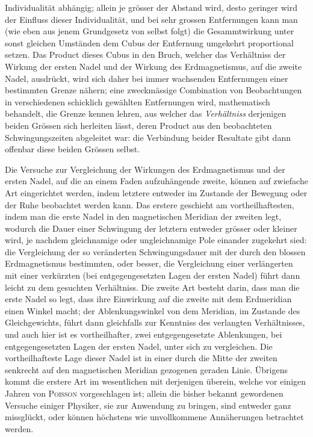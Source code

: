 Individualität abhängig; allein je grösser der Abstand wird, desto
geringer wird der Einfluss dieser Individualität, und bei sehr grossen
Entfernungen kann man (wie eben aus jenem Grundgesetz von selbst folgt)
die Gesammtwirkung unter sonst gleichen Umständen dem Cubus der Entfernung
umgekehrt proportional setzen. Das Product dieses Cubus in den Bruch,
welcher das Verhältniss der Wirkung der ersten Nadel und der Wirkung des
Erdmagnetismus, auf die zweite Nadel, ausdrückt, wird sich daher bei immer
wachsenden Entfernungen einer bestimmten Grenze nähern; eine zweckmässige
Combination von Beobachtungen in verschiedenen schicklich gewählten
Entfernungen wird, mathematisch behandelt, die Grenze kennen lehren,
aus welcher das \textit{Verhältniss} derjenigen beiden Grössen sich
herleiten lässt, deren Product aus den beobachteten Schwingungszeiten
abgeleitet war: die Verbindung beider Resultate gibt dann offenbar
diese beiden Grössen selbst.

Die Versuche zur Vergleichung der Wirkungen des Erdmagnetismus und der
ersten Nadel, auf die an einem Faden aufzuhängende zweite, können auf
\clearpage
{}
\noindent
zwiefache Art eingerichtet werden, indem letztere entweder im Zustande der
Bewegung oder der Ruhe beobachtet werden kann. Das erstere geschieht am
vortheilhaftesten, indem man die erste Nadel in den magnetischen Meridian
der zweiten legt, wodurch die Dauer einer Schwingung der letztern entweder
grösser oder kleiner wird, je nachdem gleichnamige oder ungleichnamige
Pole einander zugekehrt sied: die Vergleichung der so veränderten
Schwingungsdauer mit der durch den blossen Erdmagnetismus bestimmten,
oder besser, die Vergleichung einer verlängerten mit einer verkürzten
(bei entgegengesetzten Lagen der ersten Nadel) führt dann leicht zu dem
gesuchten Verhältniss. Die zweite Art besteht darin, dass man die erste
Nadel so legt, dass ihre Einwirkung auf die zweite mit dem Erdmeridian
einen Winkel macht; der Ablenkungswinkel von dem Meridian, im Zustande
des Gleichgewichts, führt dann gleichfalls zur Kenntniss des verlangten
Verhältnisses, und auch hier ist es vortheilhafter, zwei entgegengesetzte
Ablenkungen, bei entgegengesetzten Lagen der ersten Nadel, unter sich zu
vergleichen. Die vortheilhafteste Lage dieser Nadel ist in einer durch
die Mitte der zweiten senkrecht auf den magnetischen Meridian gezogenen
geraden Linie. Übrigens kommt die erstere Art im wesentlichen mit
derjenigen überein, welche vor einigen Jahren von \textsc{Poisson}
vorgeschlagen ist; allein die bisher bekannt gewordenen Versuche einiger
Physiker, sie zur Anwendung zu bringen, sind entweder ganz missglückt,
oder können höchstens wie unvollkommene Annäherungen betrachtet werden.


